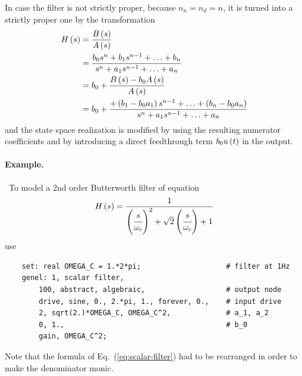 In case the filter is not strictly proper, because $n_n=n_d=n$,
it is turned into a strictly proper one by the transformation
\begin{align*}
	H\left( s \right)
	&= \frac{B\left( s \right)}{A\left( s \right)} \\
	&= \frac{
		b_0 s^n
		+ b_1 s^{n-1}
		+ \ldots
		+ b_n
	}{
		s^n
		+ a_1 s^{n-1}
		+ \ldots
		+ a_n
	} \\
	&= b_0 + \frac{B\left( s \right) - b_0 A\left( s \right)}{A\left( s \right)} \\
	&= b_0 + \frac{
		+ \left( b_1 - b_0 a_1 \right) s^{n-1}
		+ \ldots
		+ \left( b_n - b_0 a_n \right)
	}{
		s^n
		+ a_1 s^{n-1}
		+ \ldots
		+ a_n
	}
\end{align*}
and the state space realization is modified by using the resulting 
numerator coefficients and by introducing a direct feedthrough term
$b_0 u\left( t \right)$ in the output.


\paragraph{Example.} \
To model a 2nd order Butterworth filter of equation
\begin{equation}
	H\left( s \right) = \frac{
		1
	}{
		\left( \cfrac{s}{\omega_c} \right)^2
		+ \sqrt{2}\left( \cfrac{s}{\omega_c} \right)
		+ 1
	}
	\label{eq:scalar-filter}
\end{equation}
use
\begin{verbatim}
    set: real OMEGA_C = 1.*2*pi;                    # filter at 1Hz
    genel: 1, scalar filter,
        100, abstract, algebraic,                   # output node
        drive, sine, 0., 2.*pi, 1., forever, 0.,    # input drive
        2, sqrt(2.)*OMEGA_C, OMEGA_C^2,             # a_1, a_2
        0, 1.,                                      # b_0
        gain, OMEGA_C^2;
\end{verbatim}
Note that the formula of Eq.~(\ref{eq:scalar-filter})
had to be rearranged in order to make the denominator monic.




